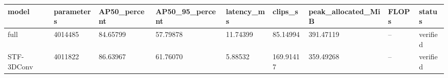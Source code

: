 \begin{tabular}{lllllllll}
\hline
model & parameters & AP50\_percent & AP50\_95\_percent & latency\_ms & clips\_s & peak\_allocated\_MiB & FLOPs & status \\
\hline
full & 4014485 & 84.65799 & 57.79878 & 11.74399 & 85.14994 & 391.47119 & -- & verified \\
STF-3DConv & 4011822 & 86.63967 & 61.76070 & 5.88532 & 169.91417 & 359.49268 & -- & verified \\
\hline
\end{tabular}
